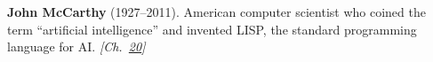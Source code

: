 \textbf{John McCarthy} (1927–2011). American computer scientist who coined the term ``artificial intelligence'' and invented LISP, the standard programming language for AI. \emph{[Ch.~\hyperref[ch:chineseroomargument]{20}]}

